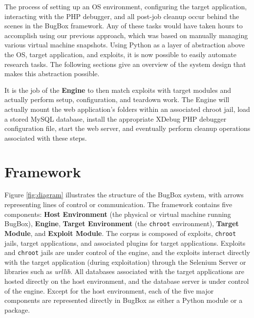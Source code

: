 \documentclass[letterpaper,twocolumn,10pt]{article}
\begin{document}
The process of setting up an OS environment, configuring the target application, interacting with the PHP debugger, and all post-job cleanup occur behind the scenes in the BugBox framework. Any of these tasks would have taken hours to accomplish using our previous approach, which was based on manually managing various virtual machine snapshots. Using Python as a layer of abstraction above the OS, target application, and exploits, it is now possible to easily automate research tasks. The following sections give an overview of the system design that makes this abstraction possible.

It is the job of the {\bf Engine} to then match exploits with target modules and actually perform setup, configuration, and teardown work. The Engine will actually mount the web application's folders within an associated chroot jail, load a stored MySQL database, install the appropriate XDebug PHP debugger configuration file, start the web server, and eventually perform cleanup operations associated with these steps.

\section{Framework}

Figure \ref{fig:diagram} illustrates the structure of the BugBox system, with arrows representing lines of control or communication. The framework contains five components: {\bf Host Environment} (the physical or virtual machine running BugBox), {\bf Engine}, {\bf Target Environment} (the \texttt{chroot} environment), {\bf Target Module}, and {\bf Exploit Module}. The corpus is composed of exploits, {\tt chroot} jails, target applications, and associated plugins for target applications. Exploits and {\tt chroot} jails are under control of the engine, and the exploits interact directly with the target application (during exploitation) through the Selenium Server or libraries such as \emph{urllib}. All databases associated with the target applications are hosted directly on the host environment, and the database server is under control of the  engine.
Except for the host environment, each of the five major components are represented directly in BugBox as either a Python module or a package.
\end{document}
